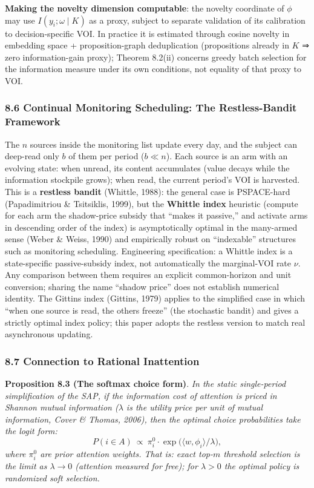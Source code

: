 \documentclass[
  11pt]{article}
\begin{document}
\textbf{Making the novelty dimension computable}: the novelty coordinate
of \(\phi\) may use \(I(y_i; \omega \mid K)\) as a proxy, subject to
separate validation of its calibration to decision-specific VOI. In
practice it is estimated through cosine novelty in embedding space +
proposition-graph deduplication (propositions already in \(K\) ⇒ zero
information-gain proxy); Theorem 8.2(ii) concerns greedy batch selection
for the information measure under its own conditions, not equality of
that proxy to VOI.

\subsubsection{8.6 Continual Monitoring Scheduling: The Restless-Bandit
Framework}\label{continual-monitoring-scheduling-the-restless-bandit-framework}

The \(n\) sources inside the monitoring list update every day, and the
subject can deep-read only \(b\) of them per period (\(b \ll n\)). Each
source is an arm with an evolving state: when unread, its content
accumulates (value decays while the information stockpile grows); when
read, the current period's VOI is harvested. This is a \textbf{restless
bandit} (Whittle, 1988): the general case is PSPACE-hard (Papadimitriou
\& Tsitsiklis, 1999), but the \textbf{Whittle index} heuristic (compute
for each arm the shadow-price subsidy that ``makes it passive,'' and
activate arms in descending order of the index) is asymptotically
optimal in the many-armed sense (Weber \& Weiss, 1990) and empirically
robust on ``indexable'' structures such as monitoring scheduling.
Engineering specification: a Whittle index is a state-specific
passive-subsidy index, not automatically the marginal-VOI rate \(\nu\).
Any comparison between them requires an explicit common-horizon and unit
conversion; sharing the name ``shadow price'' does not establish
numerical identity. The Gittins index (Gittins, 1979) applies to the
simplified case in which ``when one source is read, the others freeze''
(the stochastic bandit) and gives a strictly optimal index policy; this
paper adopts the restless version to match real asynchronous updating.

\subsubsection{8.7 Connection to Rational
Inattention}\label{connection-to-rational-inattention}

\textbf{Proposition 8.3 (The softmax choice form)}. \emph{In the static
single-period simplification of the SAP, if the information cost of
attention is priced in Shannon mutual information (\(\lambda\) is the
utility price per unit of mutual information, Cover \& Thomas, 2006),
then the optimal choice probabilities take the logit form:}
\[P(i \in A) \ \propto\ \pi_i^0 \cdot \exp\big(\langle w, \phi_i\rangle / \lambda\big),\]
\emph{where \(\pi_i^0\) are prior attention weights. That is: exact
top-\(m\) threshold selection is the limit as \(\lambda \to 0\)
(attention measured for free); for \(\lambda > 0\) the optimal policy is
randomized soft selection.}
\end{document}
